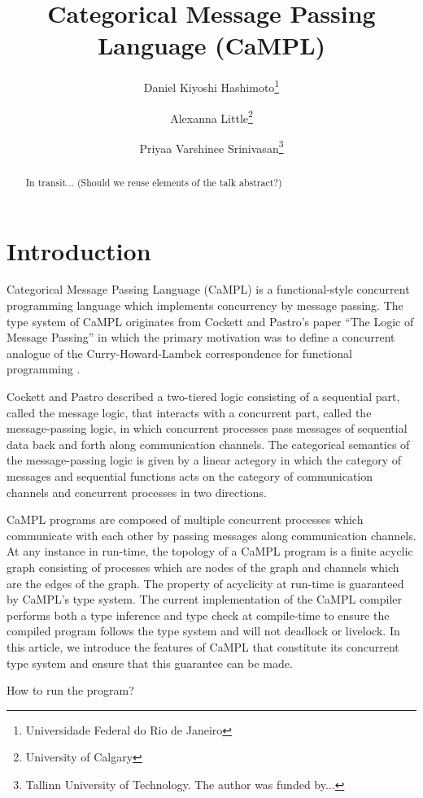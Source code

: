 \documentclass[11pt]{article}
\title{Categorical Message Passing Language (CaMPL)}
\author{
    Daniel Kiyoshi Hashimoto\thanks{Universidade Federal do Rio de Janeiro} \and Alexanna Little\thanks{University of Calgary} \and Priyaa Varshinee Srinivasan\thanks{Tallinn University of Technology. The author was funded by...}}
\begin{document}
\maketitle

\begin{abstract} In transit... (Should we reuse elements of the talk abstract?)
\end{abstract}

\section{Introduction}

Categorical Message Passing Language (CaMPL) is a functional-style concurrent programming language which implements concurrency by message passing. The type system of CaMPL originates from Cockett and Pastro’s paper “The Logic of Message Passing” in which the primary motivation was to define a concurrent analogue of the Curry-Howard-Lambek correspondence for functional programming \cite{CoP07}. 

Cockett and Pastro described a two-tiered logic consisting of a sequential part, called the message logic, that interacts with a 
concurrent part, called the message-passing logic, in which concurrent processes pass messages
of sequential data back and forth along communication channels. The categorical semantics of the message-passing logic is
given by a linear actegory in which the category of messages and sequential functions acts
on the category of communication channels and concurrent processes in two directions. 


CaMPL programs are composed of multiple concurrent processes which communicate
with each other by passing messages along communication channels. At any instance in run-time, the topology of a CaMPL program is a finite acyclic graph consisting of processes which are nodes of the graph and channels which are the edges of the graph. 
The property of acyclicity at run-time is guaranteed by CaMPL's type system.
The current implementation of the CaMPL compiler performs both a type inference and type check at compile-time to ensure the compiled program follows the type system and will not deadlock or livelock. In this article, we introduce the features of CaMPL that constitute its concurrent type system and ensure that this guarantee can be made.

How to run the program?
\end{document}
